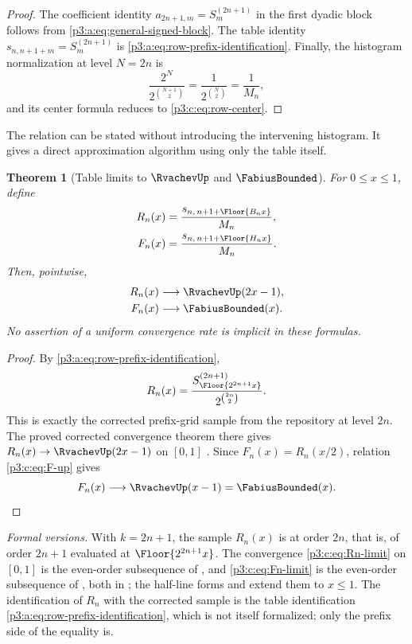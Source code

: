 \documentclass[11pt,oneside]{article}
\numberwithin{equation}{section}
\newtheorem{theorem}{Theorem}[section]
\theoremstyle{definition}
\theoremstyle{remark}
\begin{document}
\begin{proof}
The coefficient identity
\(a_{2n+1,m}=S_{m}^{(2n+1)}\) in the first dyadic block follows from
\cref{p3:a:eq:general-signed-block}.  The table identity
\(s_{n,n+1+m}=S_{m}^{(2n+1)}\) is \cref{p3:a:eq:row-prefix-identification}.  Finally, the
histogram normalization at level \(N=2n\) is
\[
 \frac{2^{N}}{2^{\binom{N+1}{2}}}
 =\frac1{2^{\binom N2}}=\frac1{M_n},
\]
and its center formula reduces to \cref{p3:c:eq:row-center}.
\end{proof}

The relation can be stated without introducing the intervening histogram.
It gives a direct approximation algorithm using only the table itself.

\begin{theorem}[Table limits to \(\RvachevUp\) and \(\FabiusBounded\)]
\label{p3:c:thm:table-fabius-limit}
For \(0\leq x\leq1\), define
\begin{align}
 R_n(x)&=\frac{s_{n,\,n+1+\Floor{B_nx}}}{M_n},      \label{p3:c:eq:Rn}\\
 F_n(x)&=\frac{s_{n,\,n+1+\Floor{H_nx}}}{M_n}.      \label{p3:c:eq:Fn}
\end{align}
Then, pointwise,
\begin{align}
 R_n(x)&\longrightarrow \RvachevUp(2x-1),                        \label{p3:c:eq:Rn-limit}\\
 F_n(x)&\longrightarrow \FabiusBounded(x).                             \label{p3:c:eq:Fn-limit}
\end{align}
No assertion of a uniform convergence rate is implicit in these formulas.
\end{theorem}

\begin{proof}
By \cref{p3:a:eq:row-prefix-identification},
\[
 R_n(x)=
 \frac{S_{\Floor{2^{2n+1}x}}^{(2n+1)}}
      {2^{\binom{2n}{2}}}.
\]
This is exactly the corrected prefix-grid sample from the repository at
level \(2n\).  The proved corrected convergence theorem there gives
\(R_n(x)\to\RvachevUp(2x-1)\) on \([0,1]\) \cite{p3:proveit}.  Since
\(F_n(x)=R_n(x/2)\), relation \cref{p3:c:eq:F-up} gives
\[
 F_n(x)\longrightarrow \RvachevUp(x-1)=\FabiusBounded(x).
\]
\end{proof}
\emph{Formal versions.}  With $k=2n+1$, the sample $R_n(x)$ is
 at order $2n$, that is,
 of order $2n+1$ evaluated at
$\Floor{2^{2n+1}x}$.  The convergence
\eqref{p3:c:eq:Rn-limit} on $[0,1]$ is the even-order subsequence of
, and
\eqref{p3:c:eq:Fn-limit} is the even-order subsequence of
, both in
; the half-line forms
 and
 extend
them to $x\le1$.  The identification of $R_n$ with the corrected sample is
the table identification \cref{p3:a:eq:row-prefix-identification}, which is
not itself formalized; only the prefix side of the equality is.
\end{document}
